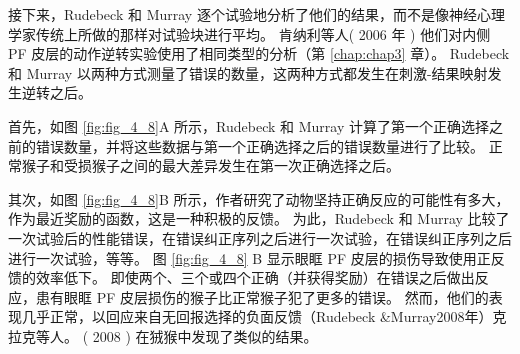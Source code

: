 接下来，Rudebeck 和 Murray 逐个试验地分析了他们的结果，而不是像神经心理学家传统上所做的那样对试验块进行平均。
肯纳利等人( 2006 年 ) 他们对内侧 PF 皮层的动作逆转实验使用了相同类型的分析（第 \ref{chap:chap3} 章）。
Rudebeck 和 Murray 以两种方式测量了错误的数量，这两种方式都发生在刺激-结果映射发生逆转之后。\par


首先，如图 \ref{fig:fig_4_8}A 所示，Rudebeck 和 Murray 计算了第一个正确选择之前的错误数量，并将这些数据与第一个正确选择之后的错误数量进行了比较。
正常猴子和受损猴子之间的最大差异发生在第一次正确选择之后。\par


其次，如图 \ref{fig:fig_4_8}B 所示，作者研究了动物坚持正确反应的可能性有多大，作为最近奖励的函数，这是一种积极的反馈。
为此，Rudebeck 和 Murray 比较了一次试验后的性能错误，在错误纠正序列之后进行一次试验，在错误纠正序列之后进行一次试验，等等。
图 \ref{fig:fig_4_8} B 显示眼眶 PF 皮层的损伤导致使用正反馈的效率低下。
即使两个、三个或四个正确（并获得奖励）在错误之后做出反应，患有眼眶 PF 皮层损伤的猴子比正常猴子犯了更多的错误。
然而，他们的表现几乎正常，以回应来自无回报选择的负面反馈（Rudebeck \&Murray2008年）克拉克等人。
( 2008 ) 在狨猴中发现了类似的结果。\par


